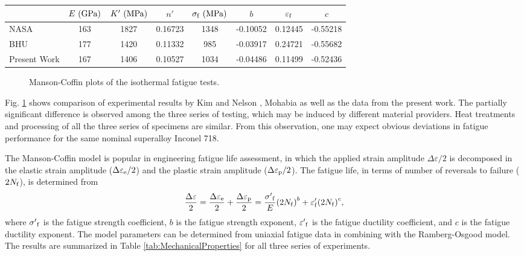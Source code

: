 \documentclass[preprint,5p,twocolumn,11pt,sort&compress]{elsarticle}
\begin{document}
\begin{table*}[htbp]
  \centering
  \caption{Basic properties of Nickel-based superalloy Inconel 718 at 650$^{\circ}$C.}
    \begin{tabular}{lccccccc}
    \hline
          & $E {\rm\ (GPa)}$     & $K' {\rm\ (MPa)}$     & $n'$     & $\sigma_{\rm f} {\rm\ (MPa)}$    & $b$     & $\varepsilon_{\rm f}$    & $c$ \\
    \hline
    NASA \cite{kim1988elevated, nelson1992creep}  & 163 & 1827  & 0.16723 & 1348 & -0.10052 & 0.12445 & -0.55218 \\
    BHU   \cite{Mahobia2014}                                     & 177 & 1420  & 0.11332 & 985   & -0.03917 & 0.24721 & -0.55682 \\
    Present  Work                                                        & 167 & 1406 & 0.10527 & 1034  & -0.04486 & 0.11499 & -0.52436 \\
    \hline
    \end{tabular}%
  \label{tab:MechanicalProperties}%
\end{table*}%

\begin{figure}[!htp]
\caption{Manson-Coffin plots of the isothermal fatigue tests.}
\label{Fig:Baseline}
\end{figure}

Fig. \ref{Fig:Baseline} shows  comparison of experimental results by Kim \cite{kim1988elevated} and Nelson \cite{nelson1992creep}, Mohabia \cite{Mahobia2014} as well as the data from the present work. The partially significant difference is observed among the three series of testing, which may be induced by different material providers. Heat treatments and processing of all the three series of specimens are similar. From this observation, one may expect obvious deviations in fatigue performance for the same nominal superalloy Inconel 718. 

The Manson-Coffin model is popular in engineering fatigue life assessment, in which the applied strain amplitude $\Delta \varepsilon/2$ is decomposed in the elastic strain amplitude ($\Delta \varepsilon_{\rm e}/2$) and the plastic strain amplitude ($\Delta \varepsilon_{\rm p}/2$). The fatigue life, in terms of number of reversals to failure ($2N_{\rm f}$), is determined from
\begin{equation}
\frac{{\Delta \varepsilon }}{2} = \frac{{\Delta {\varepsilon _{\rm e}}}}{2} + \frac{{\Delta {\varepsilon _{\rm p}}}}{2} = \frac{{{{\sigma '}_{\rm f}}}}{E}{\left( {2{N_{\rm f}}} \right)^b} + {\varepsilon '_{\rm f}}{\left( {2{N_{\rm f}}} \right)^c},
\label{Equ:CoffinManson}
\end{equation}
where ${{{\sigma '}_{\rm f}}}$ is the fatigue strength coefficient, $b$ is the fatigue strength exponent, ${{{\varepsilon '}_{\rm f}}}$ is the fatigue ductility coefficient, and $c$ is the fatigue ductility exponent. The model parameters can be determined from uniaxial fatigue data in combining with the Ramberg-Osgood model. The results are summarized in Table \ref{tab:MechanicalProperties} for all three series of experiments.
\end{document}
